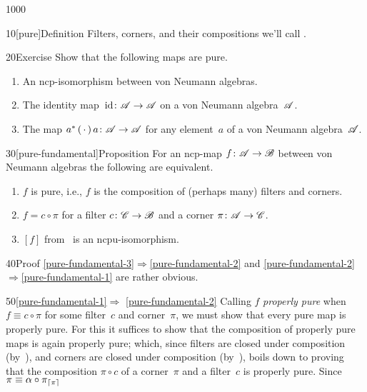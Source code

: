 \begin{parsec}{1000}%
\begin{point}{10}[pure]{Definition}%
Filters, corners,
and their compositions we'll call .%
\end{point}
\begin{point}{20}{Exercise}%
Show that the following maps are pure.
\begin{enumerate}%
\item
An ncp-isomorphism between von Neumann algebras.
\item
The identity map~$\mathrm{id}\colon \mathscr{A}\to\mathscr{A}$
on a von Neumann algebra~$\mathscr{A}$.
\item
The map $a^*\,(\,\cdot\,)\,a\colon \mathscr{A}\to\mathscr{A}$
for any element~$a$ of a von Neumann algebra~$\mathscr{A}$.
\end{enumerate}
\spacingfix%
\end{point}%
\begin{point}{30}[pure-fundamental]{Proposition}%
For an ncp-map $f\colon \mathscr{A}\to\mathscr{B}$ between von Neumann algebras
the following are equivalent.
\begin{enumerate}
\item 
\label{pure-fundamental-1}
	$f$ is pure, i.e., $f$ is the composition
	of (perhaps many) filters and corners.
\item
\label{pure-fundamental-2}
	$f = c\circ \pi$ for a filter $c\colon \mathscr{C}\to\mathscr{B}$
	and a corner $\pi\colon \mathscr{A}\to\mathscr{C}$.
\item
\label{pure-fundamental-3}
	$[f]$ from~ is an ncpu-isomorphism.
\end{enumerate}
\spacingfix%
\begin{point}{40}{Proof}%
\ref{pure-fundamental-3}$\Longrightarrow$\ref{pure-fundamental-2}
and \ref{pure-fundamental-2}$\Longrightarrow$\ref{pure-fundamental-1}
are rather obvious.
\begin{point}{50}{\ref{pure-fundamental-1}$\Longrightarrow$%
\ref{pure-fundamental-2}}%
Calling $f$ \emph{properly pure}
when~$f\equiv c\circ \pi$
for some filter~$c$ and corner~$\pi$,
we must show that every pure map is properly pure.
For this it suffices to show that the composition of properly
pure maps is again properly pure;
which,
since filters are closed under composition
(by~),
and corners are closed under composition
(by~),
boils down to proving that the composition
$\pi\circ c$ of a corner~$\pi$ and a filter~$c$
is properly pure.
Since~$\pi\equiv \alpha\circ \pi_{\left\lceil\pi\right\rceil}$

\end{point}
\end{point}
\end{point}
\end{parsec}
